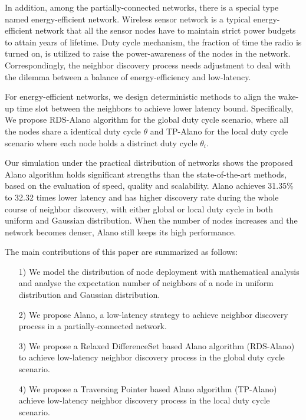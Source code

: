 In addition, among the partially-connected networks, there is a special 
type named energy-efficient network.
Wireless sensor network is a typical energy-efficient network that all the sensor nodes have to maintain 
strict power budgets to attain years of lifetime\cite{dunkels2011contikimac}.
Duty cycle mechanism, the fraction of time the radio is turned on, is 
utilized to raise the power-awareness of the nodes in the network.
Correspondingly, the neighbor discovery process 
needs adjustment to deal with the dilemma between 
a balance of energy-efficiency and low-latency.


For energy-efficient networks, we design deterministic methods
to align the wake-up time slot between the neighbors to achieve lower latency bound.
Specifically, We propose RDS-Alano algorithm for the global duty cycle scenario, where 
all the nodes share a identical duty cycle $\theta$ and TP-Alano for the
local duty cycle scenario where each node holds a distrinct duty cycle $\theta_i$. 


Our simulation under the practical distribution of networks 
\cite{wang2013gaussian} shows the proposed Alano algorithm
holds significant strengths than the state-of-the-art methods,
based on the evaluation of speed, quality and scalability.
Alano achieves 31.35\% to 32.32 times lower latency
and has higher discovery rate during the whole course of neighbor discovery, 
with either global or local duty cycle in both uniform and Gaussian distribution.
When the number of nodes increases and the network becomes denser, 
Alano still keeps its high performance. 


The main contributions of this paper are summarized as follows:
\begin{itemize}
\item[1)] We model the distribution of node deployment with mathematical analysis 
and analyse the expectation number of neighbors of a node in uniform distribution and Gaussian
distribution.
\item[2)] We propose Alano, a low-latency strategy to achieve neighbor discovery process
in a partially-connected network.
\item[3)] We propose a Relaxed DifferenceSet based Alano algorithm (RDS-Alano) 
to achieve low-latency neighbor discovery process in the global duty cycle scenario. 
\item[4)] We propose a Traversing Pointer based Alano algorithm (TP-Alano) 
achieve low-latency neighbor discovery process in the local duty cycle scenario. 
\end{itemize}


